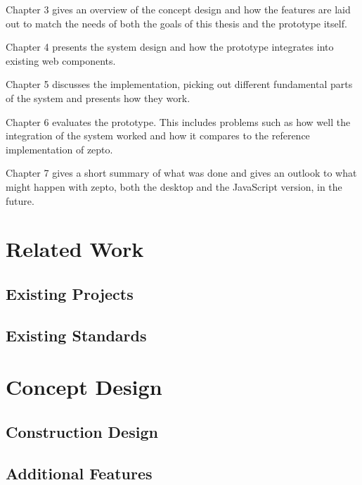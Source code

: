\documentclass[oneside,11pt,xetex]{scrbook}
\begin{document}
Chapter 3 gives an overview of the concept design and how the features are laid out to match the needs
of both the goals of this thesis and the prototype itself.

Chapter 4 presents the system design and how the prototype integrates into existing web components.

Chapter 5 discusses the implementation, picking out different fundamental parts of the system and
presents how they work.

Chapter 6 evaluates the prototype. This includes problems such as how well the integration of the
system worked and how it compares to the reference implementation of zepto.

Chapter 7 gives a short summary of what was done and gives an outlook to what might happen with
zepto, both the desktop and the JavaScript version, in the future.

\chapter{Related Work}
\label{chap:RelatedWork}

\section{Existing Projects}

\section{Existing Standards}


\chapter{Concept Design}
\label{chap:ConceptDesign}

\section{Construction Design}

\section{Additional Features}


\end{document}
